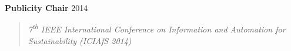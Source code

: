 \documentclass[mm]{res} %
\begin{document}
\begin{resume}



\textbf{Publicity Chair} \hfill 2014 
\begin{quote}
\emph{7\textsuperscript{th} IEEE International Conference on Information and Automation for Sustainability (ICIAfS 2014)}
\end{quote}








\end{resume}
\end{document}
